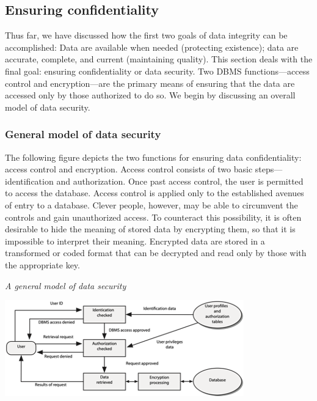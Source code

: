 \documentclass[
]{article}
\begin{document}
\hypertarget{ensuring-confidentiality}{%
\subsection*{Ensuring confidentiality}\label{ensuring-confidentiality}}

Thus far, we have discussed how the first two goals of data integrity
can be accomplished: Data are available when needed (protecting
existence); data are accurate, complete, and current (maintaining
quality). This section deals with the final goal: ensuring
confidentiality or data security. Two DBMS functions---access control
and encryption---are the primary means of ensuring that the data are
accessed only by those authorized to do so. We begin by discussing an
overall model of data security.

\hypertarget{general-model-of-data-security}{%
\subsubsection*{General model of data security}\label{general-model-of-data-security}}

The following figure depicts the two functions for ensuring data
confidentiality: access control and encryption. Access control consists
of two basic steps---identification and authorization. Once past access
control, the user is permitted to access the database. Access control is
applied only to the established avenues of entry to a database. Clever
people, however, may be able to circumvent the controls and gain
unauthorized access. To counteract this possibility, it is often
desirable to hide the meaning of stored data by encrypting them, so that
it is impossible to interpret their meaning. Encrypted data are stored
in a transformed or coded format that can be decrypted and read only by
those with the appropriate key.

\emph{A general model of data security}

\includegraphics{Figures/Chapter 23/data-security-model.png}
\end{document}
